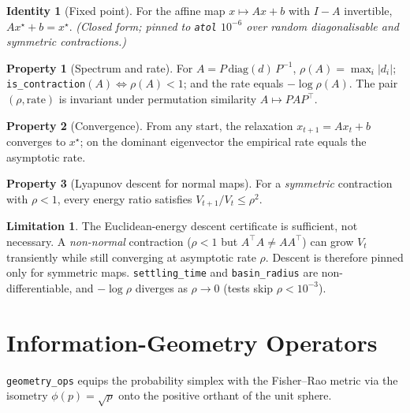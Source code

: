 \documentclass[11pt]{article}
\theoremstyle{definition}
\newtheorem{property}{Property}[section]
\newtheorem{identity}{Identity}[section]
\newtheorem{limitation}{Limitation}[section]
\newcommand{\code}[1]{\texttt{#1}}
\begin{document}
\begin{identity}[Fixed point]
For the affine map $x\mapsto Ax+b$ with $I-A$ invertible,
$A x^\star + b = x^\star$. \emph{(Closed form; pinned to \code{atol} $10^{-6}$
over random diagonalisable and symmetric contractions.)}
\end{identity}

\begin{property}[Spectrum and rate]
For $A=P\,\mathrm{diag}(d)\,P^{-1}$, $\rho(A)=\max_i|d_i|$;
\code{is\_contraction}$(A)\Leftrightarrow\rho(A)<1$; and the rate equals
$-\log\rho(A)$. The pair $(\rho,\text{rate})$ is invariant under
permutation similarity $A\mapsto P A P^\top$.
\end{property}

\begin{property}[Convergence]
From any start, the relaxation $x_{t+1}=Ax_t+b$ converges to $x^\star$; on
the dominant eigenvector the empirical rate equals the asymptotic rate.
\end{property}

\begin{property}[Lyapunov descent for normal maps]
For a \emph{symmetric} contraction with $\rho<1$, every energy ratio
satisfies $V_{t+1}/V_t\le\rho^2$.
\end{property}

\begin{limitation}
The Euclidean-energy descent certificate is sufficient, not necessary. A
\emph{non-normal} contraction ($\rho<1$ but $A^\top A\neq AA^\top$) can grow
$V_t$ transiently while still converging at asymptotic rate $\rho$. Descent
is therefore pinned only for symmetric maps. \code{settling\_time} and
\code{basin\_radius} are non-differentiable, and $-\log\rho$ diverges as
$\rho\to0$ (tests skip $\rho<10^{-3}$).
\end{limitation}

\section{Information-Geometry Operators}\label{sec:geometry}
\code{geometry\_ops} equips the probability simplex with the Fisher--Rao
metric via the isometry $\phi(p)=\sqrt{p}$ onto the positive orthant of the
unit sphere.
\end{document}
